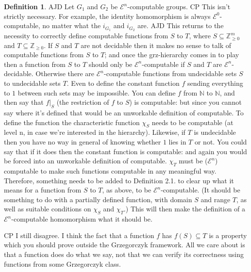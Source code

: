 \documentclass[a4paper]{article}
\newcommand{\grz}[1]{$\mathcal{E}^{#1}$}	%
\newcommand{\NN}{\mathbb{N}}	%
\newcommand{\ZZ}{\mathbb{Z}}
\theoremstyle{plain}
\theoremstyle{definition}
\newtheorem{definition}[theorem]{Definition}
\newenvironment{cpe}{\noindent\color{OliveGreen} CP }{}
\newcommand{\cp}[1]{
\begin{cpe} #1 \end{cpe}}
\newenvironment{ad}{\noindent\color{blue} AJD }{}
\newcommand{\ajd}[1]{
\begin{ad} #1 \end{ad}}
\begin{document}
	
\begin{definition}
 \ajd{Let $G_1$ and $G_2$ be \grz{n}-computable groups. }\cp{This isn't strictly necessary. For example, the identity homomorphism is always \grz{0}-computable, no matter what the $i_{G_1}$ and $i_{G_2}$ are.} \ajd{This returns
to the necessity to correctly define computable functions from $S$ to $T$, 
where $S\subseteq \ZZ_{\geq 0}^m$ and $T\subseteq \ZZ_{\geq 0}$. If 
$S$ and $T$ are not decidable then it makes no sense to talk of computable
functions from $S$ to $T$; and once  the grz-hierarchy comes in to play then
a function from $S$ to $T$ should only be \grz{n}-computable if $S$ and 
$T$ are \grz{n}-decidable. Otherwise there are \grz{n}-computable 
functions from undecidable sets $S$ to undecidable sets $T$. Even to
define the  constant function $f$ sending everything to $1$ between such 
sets may be impossible. You
can  define $f$ from $\NN$ to $\NN$, and then say that $f|_{S}$ (the
restriction of $f$ to $S$) is computable:   
but since you cannot say where it's defined that 
would be an unworkable definition of computable. To define the function
the characteristic function $\chi_S$ needs to be computable (at level n,
in case we're interested in the hierarchy). Likewise, if $T$ is undecidable
then you have no way in general of knowing whether 
$1$ lies in $T$ or not. You could say that if it does then the 
constant function is computable: and again you would be forced into
an unworkable definition of computable. $\chi_T$ must be (\grz{n}) computable 
to make such functions computable in any meaningful way. 
Therefore,
 something needs to be
added to Definition 2.1. to clear up what it means for a function from
$S$ to $T$, as above, to be \grz{n}-computable. (It should be something
to do with a partially defined function, with domain $S$ and range $T$,
as well as suitable conditions on $\chi_S$ and $\chi_T$.) This will then make
the definition of a \grz{n}-computable homomorphism what it should be.}

\cp{I still disagree. I think the fact that a function $f$ has $f(S) \subseteq T$ is a property which you should prove outside the Grzegorczyk framework. All we care about is that a function does do what we say, not that we can verify its correctness using functions from some Grzegorczyk class. 

}
\end{definition}
\end{document}
